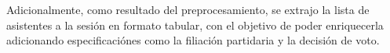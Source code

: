 \par
Adicionalmente, como resultado del preprocesamiento, se extrajo la lista de
asistentes a la sesión en formato tabular, con el objetivo de poder
enriquecerla adicionando especificaciónes como la filiación partidaria y la
decisión de voto.

